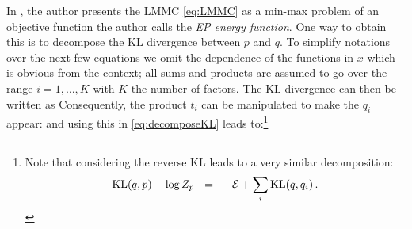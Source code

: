 In \citet{minka01c}, the author presents the LMMC \eqref{eq:LMMC} as a min-max problem of an objective function the author calls the \emph{EP energy function}.
One way to obtain this is to decompose the KL divergence between $p$ and $q$. 
To simplify notations over the next few equations we omit the dependence of the functions in $x$ which is obvious from the context; all sums and products are assumed to go over the range $i=1,\dots,K$ with $K$ the number of factors. 
The KL divergence can then be written as
%
%	
Consequently, the product $t_i$ can be manipulated to make the $q_i$ appear:
%
%
and using this in \eqref{eq:decomposeKL} leads to:\footnote{Note that considering the reverse KL leads to a very similar decomposition:
\[\mathrm{KL}\!\left(q,p\right) - \log Z_p \quad\!\!=\quad\!\! -\mathcal E + \sum_i \mathrm{KL}\!\left(q,q_i\right).\]}
